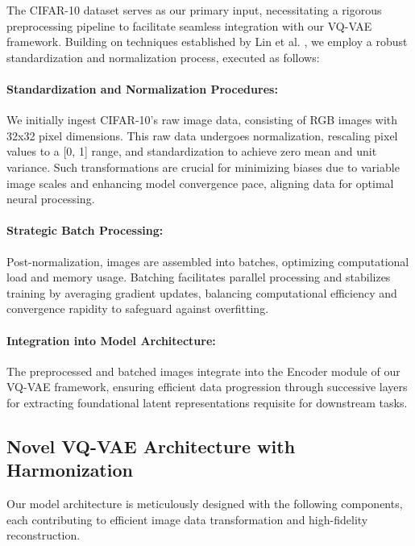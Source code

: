 \documentclass{article} %
\begin{document}
The CIFAR-10 dataset serves as our primary input, necessitating a rigorous preprocessing pipeline to facilitate seamless integration with our VQ-VAE framework. Building on techniques established by Lin et al. \citep{lin2014microsoft}, we employ a robust standardization and normalization process, executed as follows:

\paragraph{Standardization and Normalization Procedures:} 

We initially ingest CIFAR-10's raw image data, consisting of RGB images with 32x32 pixel dimensions. This raw data undergoes normalization, rescaling pixel values to a [0, 1] range, and standardization to achieve zero mean and unit variance. Such transformations are crucial for minimizing biases due to variable image scales and enhancing model convergence pace, aligning data for optimal neural processing.

\paragraph{Strategic Batch Processing:} 

Post-normalization, images are assembled into batches, optimizing computational load and memory usage. Batching facilitates parallel processing and stabilizes training by averaging gradient updates, balancing computational efficiency and convergence rapidity to safeguard against overfitting. 

\paragraph{Integration into Model Architecture:} 

The preprocessed and batched images integrate into the Encoder module of our VQ-VAE framework, ensuring efficient data progression through successive layers for extracting foundational latent representations requisite for downstream tasks.

\subsection{Novel VQ-VAE Architecture with Harmonization}

Our model architecture is meticulously designed with the following components, each contributing to efficient image data transformation and high-fidelity reconstruction.
\end{document}
